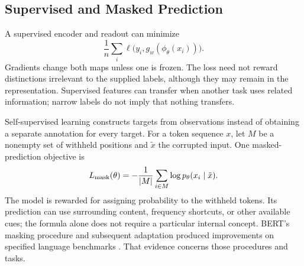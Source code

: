 \subsection{Supervised and Masked Prediction}

A supervised encoder and readout can minimize
\[
\frac1n\sum_i\ell\bigl(y_i,g_w(\phi_\theta(x_i))\bigr).
\]
Gradients change both maps unless one is frozen. The loss need not reward distinctions irrelevant to the supplied labels, although they may remain in the representation. Supervised features can transfer when another task uses related information; narrow labels do not imply that nothing transfers.

Self-supervised learning constructs targets from observations instead of obtaining a separate annotation for every target. For a token sequence $x$, let $M$ be a nonempty set of withheld positions and $\tilde x$ the corrupted input. One masked-prediction objective is
\[
L_{\rm mask}(\theta)=-\frac1{|M|}\sum_{i\in M}
\log p_\theta(x_i\mid\tilde x).
\]
The model is rewarded for assigning probability to the withheld tokens. Its prediction can use surrounding content, frequency shortcuts, or other available cues; the formula alone does not require a particular internal concept. BERT's masking procedure and subsequent adaptation produced improvements on specified language benchmarks \citep{devlin2019}. That evidence concerns those procedures and tasks.

\par\addvspace{\intextsep}\noindent\begin{minipage}{\linewidth}
\centering
{}
\label{fig:selfsupervised-workflow}
\end{minipage}\par\addvspace{\intextsep}

